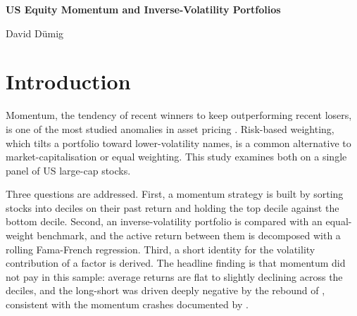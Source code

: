 \documentclass[11pt]{article}
\begin{document}
\begin{titlepage}
  \centering
  \vspace*{5cm}
  {\LARGE\bfseries US Equity Momentum and Inverse-Volatility Portfolios\par}
  \vspace{1.5cm}
  {\large David Dümig\par}
  \vfill
\end{titlepage}

\begin{abstract}
\noindent
This study rebuilds, from monthly prices of \nStocks{} US large-cap stocks between \sampleStart{}
and \sampleEnd{}, a decile momentum strategy and an inverse-volatility portfolio measured against
an equal-weight benchmark. Over this sample the momentum long-short returned \momMean{} per month and
is not statistically distinguishable from zero. It carries a large loading on the published
momentum factor yet a significant negative four-factor alpha, so a ten-percent breakpoint
equal-weighted construction is a weaker version of the factor. The inverse-volatility portfolio
tracked the equal-weight benchmark closely, with an active return that was small and
insignificant. The conclusion is robust to alternative formation windows, quintile sorting, and
transaction costs.
\end{abstract}

\section{Introduction}

Momentum, the tendency of recent winners to keep outperforming recent losers, is one of the most
studied anomalies in asset pricing \citep{jegadeesh1993, carhart1997}. Risk-based weighting, which
tilts a portfolio toward lower-volatility names, is a common alternative to market-capitalisation
or equal weighting. This study examines both on a single panel of \nStocks{} US large-cap stocks.

Three questions are addressed. First, a momentum strategy is built by sorting stocks into deciles
on their past return and holding the top decile against the bottom decile. Second, an
inverse-volatility portfolio is compared with an equal-weight benchmark, and the active return
between them is decomposed with a rolling Fama-French regression. Third, a short identity for the
volatility contribution of a factor is derived. The headline finding is that momentum did not pay
in this sample: average returns are flat to slightly declining across the deciles, and the
long-short was driven deeply negative by the rebound of \momMinMonth{}, consistent with the
momentum crashes documented by \citet{daniel2016}.
\end{document}

